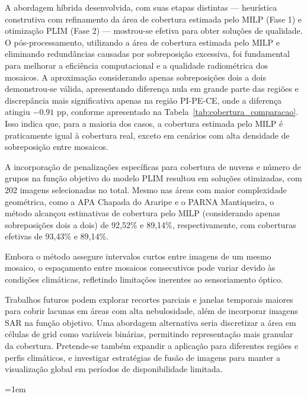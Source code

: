 \documentclass[a4paper,11pt]{article}
\begin{document}
A abordagem híbrida desenvolvida, com suas etapas distintas --- heurística construtiva com refinamento da área de cobertura estimada pelo MILP (Fase 1) e otimização PLIM (Fase 2)  --- mostrou-se efetiva para obter soluções de qualidade. O pós-processamento, utilizando a área de cobertura estimada pelo MILP e eliminando redundâncias causadas por sobreposição excessiva, foi fundamental para melhorar a eficiência computacional e a qualidade radiométrica dos mosaicos. A aproximação considerando apenas sobreposições dois a dois demonstrou-se válida, apresentando diferença nula em grande parte das regiões e discrepância mais significativa apenas na região PI-PE-CE, onde a diferença atingiu $-0.91$ pp, conforme apresentado na Tabela~\ref{tab:cobertura_comparacao}. Isso indica que, para a maioria dos casos, a cobertura estimada pelo MILP é praticamente igual à cobertura real, exceto em cenários com alta densidade de sobreposição entre mosaicos.

A incorporação de penalizações específicas para cobertura de nuvens e número de grupos na função objetivo do modelo PLIM resultou em soluções otimizadas, com 202 imagens selecionadas no total. Mesmo nas áreas com maior complexidade geométrica, como a APA Chapada do Araripe e o PARNA Mantiqueira, o método alcançou estimativas de cobertura pelo MILP (considerando apenas sobreposições dois a dois) de 92,52\% e 89,14\%, respectivamente, com coberturas efetivas de 93,43\% e 89,14\%.

Embora o método assegure intervalos curtos entre imagens de um mesmo mosaico, o espaçamento entre mosaicos consecutivos pode variar devido às condições climáticas, refletindo limitações inerentes ao sensoriamento óptico.

Trabalhos futuros podem explorar recortes parciais e janelas temporais maiores para cobrir lacunas em áreas com alta nebulosidade, além de incorporar imagens SAR na função objetivo. Uma abordagem alternativa seria discretizar a área em células de grid como variáveis binárias, permitindo representação mais granular da cobertura. Pretende-se também expandir a aplicação para diferentes regiões e perfis climáticos, e investigar estratégias de fusão de imagens para manter a visualização global em períodos de disponibilidade limitada.

\vspace{-6mm}
\begingroup
  \sloppy
  \emergencystretch=1em
  
  
  \nocite{*}
\endgroup
\end{document}
